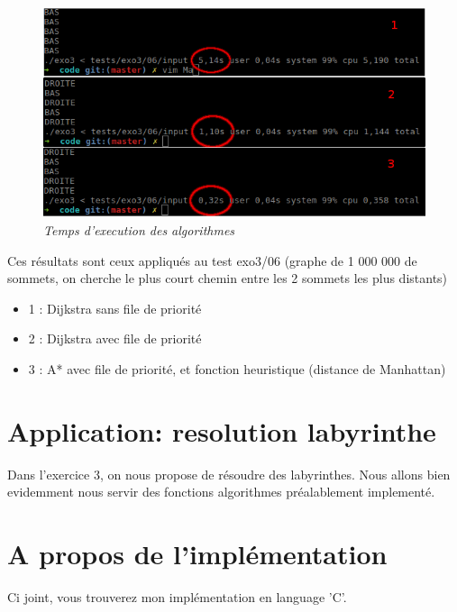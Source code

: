 \documentclass[a4paper,10pt]{article}
\begin{document}
    \begin{figure}[!h]
      \begin{center}
	\includegraphics[width=12cm,height=\textheight,keepaspectratio]{./images/performances.png}
      \end{center}
      \caption{\textit{Temps d'execution des algorithmes}}
    \end{figure}
    Ces résultats sont ceux appliqués au test exo3/06\newline
    (graphe de 1 000 000 de sommets, on cherche le plus court chemin entre les 2 sommets les plus distants)
    \begin{itemize}[label=-]
      \item 1 : Dijkstra sans file de priorité
      \item 2 : Dijkstra avec file de priorité
      \item 3 : A* avec file de priorité, et fonction heuristique (distance de Manhattan)
    \end{itemize}
    
  \newpage
  \section{Application: resolution labyrinthe}
    Dans l'exercice 3, on nous propose de résoudre des labyrinthes. Nous allons bien evidemment nous servir des fonctions algorithmes
    préalablement implementé.
  \newpage
  \section{A propos de l'implémentation}
    Ci joint, vous trouverez mon implémentation en language 'C'.
\end{document}
